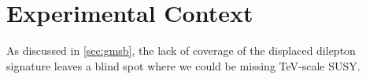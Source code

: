 \chapter{Experimental Context}
\label{chap:context}

As discussed in \autoref{sec:gmsb}, the lack of coverage of the displaced dilepton signature leaves a blind spot where we could be missing TeV-scale \ac{SUSY}.